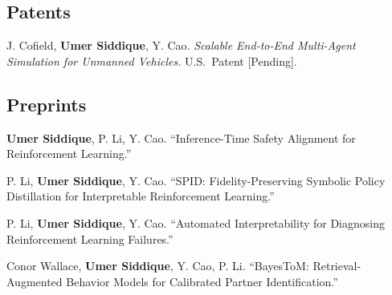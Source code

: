 \documentclass[letterpaper,11pt]{article}
\begin{document}
\subsection*{Patents}
\begin{publist}[label={[P\arabic*]}]
    \item J. Cofield, \textbf{Umer Siddique}, Y. Cao. \textit{Scalable End-to-End Multi-Agent Simulation for Unmanned Vehicles.} U.S.\ Patent [Pending].
\end{publist}

\subsection*{Preprints}
\begin{publist}[label={[U\arabic*]}]
    \item \textbf{Umer Siddique}, P. Li, Y. Cao. ``Inference-Time Safety Alignment for Reinforcement Learning.''
    \item P. Li, \textbf{Umer Siddique}, Y. Cao. ``SPID: Fidelity-Preserving Symbolic Policy Distillation for Interpretable Reinforcement Learning.''
    \item P. Li, \textbf{Umer Siddique}, Y. Cao. ``Automated Interpretability for Diagnosing Reinforcement Learning Failures.''
    \item Conor Wallace, \textbf{Umer Siddique}, Y. Cao, P. Li. ``BayesToM: Retrieval-Augmented Behavior Models for Calibrated Partner Identification.''
    
\end{publist}
\end{document}
